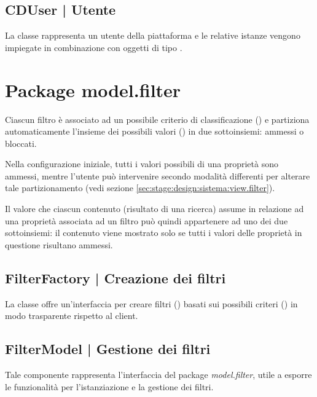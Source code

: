 \documentclass[10pt,a4paper,headinclude,footinclude,hidelinks]{scrreprt} %
\begin{document}
	\subsection[CDUser]{CDUser | Utente}
	\label{sec:stage:design:sistema:model.criteria:user}
	La classe rappresenta un utente della piattaforma e le relative istanze vengono impiegate in combinazione con oggetti di tipo \textit{}.

	\section{Package model.filter}
	\label{sec:stage:design:sistema:model.filter}
	Ciascun filtro è associato ad un possibile criterio di classificazione (\textit{}) e partiziona automaticamente l'insieme dei possibili valori (\textit{}) in due sottoinsiemi: ammessi o bloccati.

	Nella configurazione iniziale, tutti i valori possibili di una proprietà sono ammessi, mentre l'utente può intervenire secondo modalità differenti per alterare tale partizionamento (vedi sezione \ref{sec:stage:design:sistema:view.filter}).
	
	Il valore che ciascun contenuto (risultato di una ricerca) assume in relazione ad una proprietà associata ad un filtro può quindi appartenere ad uno dei due sottoinsiemi: il contenuto viene mostrato solo se tutti i valori delle proprietà in questione risultano ammessi.

	\subsection[FilterFactory]{FilterFactory | Creazione dei filtri}
	\label{sec:stage:design:sistema:model.filter:filter-factory}
	La classe \textit{} offre un'interfaccia per creare filtri (\textit{}) basati sui possibili criteri (\textit{}) in modo trasparente rispetto al client. 

	\subsection[FilterModel]{FilterModel | Gestione dei filtri}
	\label{sec:stage:design:sistema:model.filter:filter-manager}
	Tale componente rappresenta l'interfaccia del package \textit{model.filter}, utile a esporre le funzionalità per l'istanziazione e la gestione dei filtri.
\end{document}

